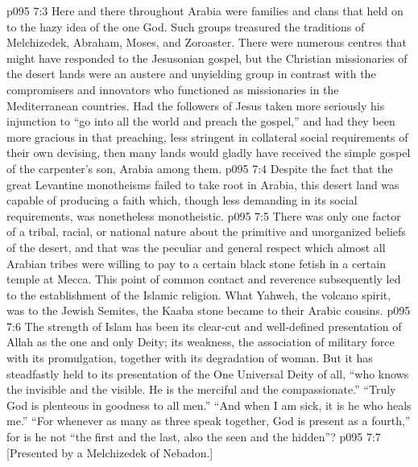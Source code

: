 \vs p095 7:3 Here and there throughout Arabia were families and clans that held on to the hazy idea of the one God. Such groups treasured the traditions of Melchizedek, Abraham, Moses, and Zoroaster. There were numerous centres that might have responded to the Jesusonian gospel, but the Christian missionaries of the desert lands were an austere and unyielding group in contrast with the compromisers and innovators who functioned as missionaries in the Mediterranean countries. Had the followers of Jesus taken more seriously his injunction to “go into all the world and preach the gospel,” and had they been more gracious in that preaching, less stringent in collateral social requirements of their own devising, then many lands would gladly have received the simple gospel of the carpenter’s son, Arabia among them.
\vs p095 7:4 Despite the fact that the great Levantine monotheisms failed to take root in Arabia, this desert land was capable of producing a faith which, though less demanding in its social requirements, was nonetheless monotheistic.
\vs p095 7:5 There was only one factor of a tribal, racial, or national nature about the primitive and unorganized beliefs of the desert, and that was the peculiar and general respect which almost all Arabian tribes were willing to pay to a certain black stone fetish in a certain temple at Mecca. This point of common contact and reverence subsequently led to the establishment of the Islamic religion. What Yahweh, the volcano spirit, was to the Jewish Semites, the Kaaba stone became to their Arabic cousins.
\vs p095 7:6 The strength of Islam has been its clear\hyp{}cut and well\hyp{}defined presentation of Allah as the one and only Deity; its weakness, the association of military force with its promulgation, together with its degradation of woman. But it has steadfastly held to its presentation of the One Universal Deity of all, “who knows the invisible and the visible. He is the merciful and the compassionate.” “Truly God is plenteous in goodness to all men.” “And when I am sick, it is he who heals me.” “For whenever as many as three speak together, God is present as a fourth,” for is he not “the first and the last, also the seen and the hidden”?
\vsetoff
\vs p095 7:7 [Presented by a Melchizedek of Nebadon.]
\quizlink
